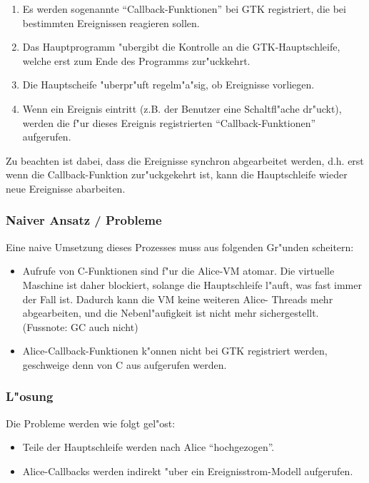 \documentclass{article}
\begin{document}
\begin{enumerate}
\item Es werden sogenannte ``Callback-Funktionen'' bei GTK registriert, die
      bei bestimmten Ereignissen reagieren sollen.
\item Das Hauptprogramm "ubergibt die Kontrolle an die GTK-Hauptschleife,
      welche erst zum Ende des Programms zur"uckkehrt.
\item Die Hauptscheife "uberpr"uft regelm"a"sig, ob Ereignisse vorliegen.
\item Wenn ein Ereignis eintritt (z.B. der Benutzer eine Schaltfl"ache 
      dr"uckt), werden die f"ur dieses Ereignis registrierten
      ``Callback-Funktionen'' aufgerufen.
\end{enumerate}

Zu beachten ist dabei, dass die Ereignisse synchron abgearbeitet werden,
d.h. erst wenn die Callback-Funktion zur"uckgekehrt ist, kann die Hauptschleife
wieder neue Ereignisse abarbeiten.


\subsubsection{Naiver Ansatz / Probleme}

Eine naive Umsetzung dieses Prozesses muss aus folgenden Gr"unden scheitern:

\begin{itemize}
\item Aufrufe von C-Funktionen sind f"ur die Alice-VM atomar. Die virtuelle
      Maschine ist daher blockiert, solange die Hauptschleife l"auft, 
      was fast immer der Fall ist. Dadurch kann die VM keine weiteren Alice-
      Threads mehr abgearbeiten, und die Nebenl"aufigkeit ist nicht mehr
      sichergestellt. (Fussnote: GC auch nicht)
\item Alice-Callback-Funktionen k"onnen nicht bei GTK registriert werden,
      geschweige denn von C aus aufgerufen werden.

\end{itemize}

\subsubsection{L"osung}

Die Probleme werden wie folgt gel"ost:

\begin{itemize}
\item Teile der Hauptschleife werden nach Alice ``hochgezogen''.
\item Alice-Callbacks werden indirekt "uber ein Ereignisstrom-Modell
      aufgerufen.
\end{itemize}
\end{document}
